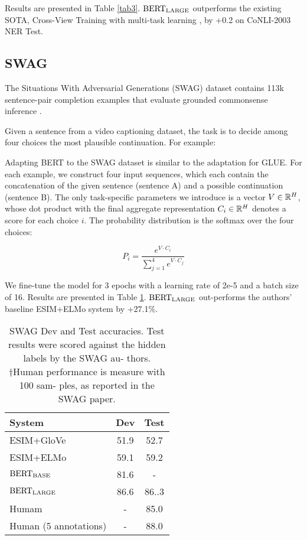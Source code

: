 	Results are presented in Table \ref{tab3}. $\rm BERT_{LARGE}$ outperforms the existing SOTA, Cross-View Training with multi-task learning \citep{Kevin2018}, by +0.2 on CoNLI-2003 NER Test.
	
	\subsection{SWAG} \label{sec4.4}
	The Situations With Adversarial Generations (SWAG) dataset contains 113k sentence-pair completion examples that evaluate grounded commonsense inference \citep{Rowan2018}.
	
	Given a sentence from a video captioning dataset, the task is to decide among four choices the most plausible continuation. For example:
	
	Adapting BERT to the SWAG dataset is similar to the adaptation for GLUE. For each example, we construct four input sequences, which each contain the concatenation of the given sentence (sentence {\selectfont A}) and a possible continuation (sentence {\selectfont B}). The only task-specific parameters we introduce is a vector $V \in \mathbb{R}^H$, whose dot product with the final aggregate representation $C_i \in \mathbb{R}^H$ denotes a score for each choice $i$. The probability distribution is the softmax over the four choices:
	
	$$P_i = \frac{e^{V \cdot C_i}}{\sum_{j=1}^4e^{V \cdot C_j}}$$
	
	We fine-tune the model for 3 epochs with a learning rate of 2e-5 and a batch size of 16. Results are presented in Table \ref{tab4}. $\rm BERT_{LARGE}$ out-performs the authors' baseline ESIM+ELMo system by +27.1\%.
	
	\begin{table}[!pt]
	\centering
	\begin{tabular}{lcc}
	\toprule
	System & Dev & Test \\
	\midrule
	ESIM+GloVe & 51.9 & 52.7 \\
	ESIM+ELMo & 59.1 & 59.2 \\
	\midrule
	$\rm BERT_{BASE}$ & 81.6 & - \\
	$\rm BERT_{LARGE}$ & 86.6 & 86..3 \\
	\midrule
	Humam & - & 85.0 \\
	Human (5 annotations) & - & 88.0 \\
	\bottomrule
	\end{tabular}
	\caption{SWAG Dev and Test accuracies. Test results were scored against the hidden labels by the SWAG au- thors. †Human performance is measure with 100 sam- ples, as reported in the SWAG paper.}
	\label{tab4}
	\end{table}
	
	
	
	
	
	